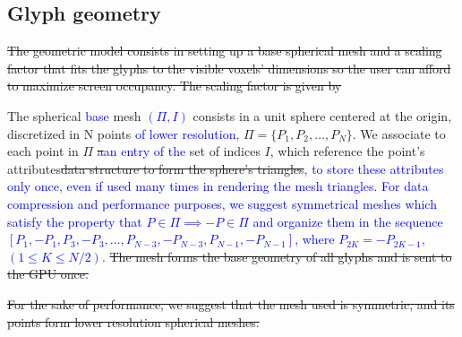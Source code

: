 \documentclass[twoside,twocolumn,10pt]{article}
\begin{document}
\subsection{Glyph geometry}
\label{ssec::glyph_resolution}


\sout{The geometric model consists in setting up a base spherical mesh and a scaling factor that fits the glyphs to the visible voxels' dimensions so the user can afford to maximize screen occupancy. The scaling factor is given by }




The spherical \textcolor{blue}{base} mesh \textcolor{blue}{$(\Pi, I)$}  consists in a unit sphere centered at the origin, discretized in N points \textcolor{blue}{of lower resolution}, $\Pi = \{P_1, P_2, \dots, P_N\}$. We associate to each point in $\Pi$ \sout{a}\textcolor{blue}{an entry of the} set of indices $I$, which reference the point's attributes\sout{data structure to form the sphere's triangles}\textcolor{blue}{, to store these attributes only once, even if used many times in rendering the mesh triangles}. \textcolor{blue}{For data compression and performance purposes, we suggest symmetrical meshes which satisfy the property that $P \in \Pi \implies -P \in \Pi$ and organize them in the sequence $[P_1, -P_1, P_3, -P_3, \dots, P_{N-3}, -P_{N-3}, P_{N-1}, -P_{N-1}]$, where $P_{2K} = -P_{2K-1}$, $(1 \leq K \leq N/2)$.} \sout{The mesh forms the base geometry of all glyphs and is sent to the GPU once.}

\sout{For the sake of performance, we suggest that the mesh used is symmetric, and its points form lower resolution spherical meshes.}
\end{document}
